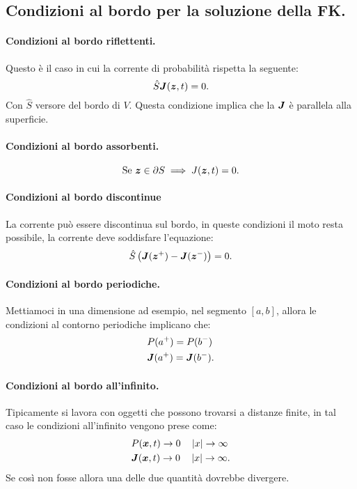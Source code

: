 \subsection{Condizioni al bordo per la soluzione della FK.}%
\label{sub:Condizioni al bordo per la soluzione della FK.}
\paragraph{Condizioni al bordo riflettenti.}%
Questo è il caso in cui la corrente di probabilità rispetta la seguente:
\[
    \hat{S}\boldsymbol{J} (\boldsymbol{z}, t) = 0
.\] 
Con $\hat{S}$ versore del bordo di $V$. Questa condizione implica che la $\boldsymbol{J}$ è parallela alla superficie.
\paragraph{Condizioni al bordo assorbenti.}%
\[
    \text{Se }\boldsymbol{z}  \in \partial S \implies  J(\boldsymbol{z}, t) = 0
.\] 
\paragraph{Condizioni al bordo discontinue}%
La corrente può essere discontinua sul bordo, in queste condizioni il moto resta possibile, la corrente deve soddisfare l'equazione:
\[
    \hat{S}\left(\boldsymbol{J} (\boldsymbol{z}^+) - \boldsymbol{J} (\boldsymbol{z}^-) \right) = 0
.\] 
\paragraph{Condizioni al bordo periodiche.}%
Mettiamoci in una dimensione ad esempio, nel segmento $\left[a, b\right]$, allora le condizioni al contorno periodiche implicano che:
\[\begin{aligned}
    & P(a^+) = P(b^-) \\
    & \boldsymbol{J} (a^+) = \boldsymbol{J} (b^-) 
.\end{aligned}\]
\paragraph{Condizioni al bordo all'infinito.}%
Tipicamente si lavora con oggetti che possono trovarsi a distanze finite, in tal caso le condizioni all'infinito vengono prese come:
\[\begin{aligned}
    & P(\boldsymbol{x}, t) \to 0 \quad \left|x\right|\to \infty\\
    & \boldsymbol{J} (\boldsymbol{x}, t) \to 0 \quad \left|x\right|\to \infty
.\end{aligned}\]
Se così non fosse allora una delle due quantità dovrebbe divergere.
